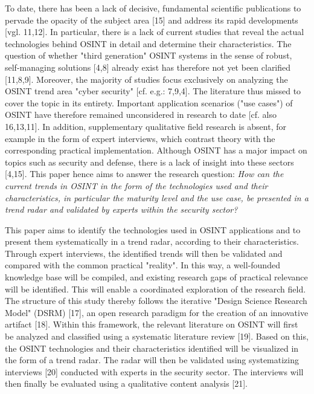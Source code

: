 \documentclass[10pt]{article}
\begin{document}
To date, there has been a lack of decisive, fundamental scientific publications to pervade the opacity of the subject area [15] and address its rapid developments [vgl. 11,12]. In particular, there is a lack of current studies that reveal the actual technologies behind OSINT in detail and determine their characteristics. The question of whether "third generation" OSINT systems in the sense of robust, self-managing solutions [4,8] already exist has therefore not yet been clarified [11,8,9]. Moreover, the majority of studies focus exclusively on analyzing the OSINT trend area "cyber security" [cf. e.g.: 7,9,4]. The literature thus missed to cover the topic in its entirety. Important application scenarios ("use cases") of OSINT have therefore remained unconsidered in research to date [cf. also 16,13,11]. In addition, supplementary qualitative field research is absent, for example in the form of expert interviews, which contrast theory with the corresponding practical implementation. Although OSINT has a major impact on topics such as security and defense, there is a lack of insight into these sectors [4,15]. This paper hence aims to answer the research question:  \textit{How can the current trends in OSINT in the form of the technologies used and their characteristics, in particular the maturity level and the use case, be presented in a trend radar and validated by experts within the security sector?}

This paper aims to identify the technologies used in OSINT applications and to present them systematically in a trend radar, according to their characteristics. Through expert interviews, the identified trends will then be validated and compared with the common practical "reality". In this way, a well-founded knowledge base will be compiled, and existing research gaps of practical relevance will be identified. This will enable a coordinated exploration of the research field. The structure of this study thereby follows the iterative "Design Science Research Model" (DSRM) [17], an open research paradigm for the creation of an innovative artifact [18]. Within this framework, the relevant literature on OSINT will first be analyzed and classified using a systematic literature review [19]. Based on this, the OSINT technologies and their characteristics identified will be visualized in the form of a trend radar. The radar will then be validated using systematizing interviews [20] conducted with experts in the security sector. The interviews will then finally be evaluated using a qualitative content analysis [21].
\end{document}
